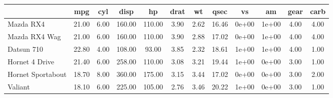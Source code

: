 \begin{tabular}{lccccccccccc}
\hline
\textbf{} & \textbf{mpg} & \textbf{cyl} & \textbf{disp} & \textbf{hp} & \textbf{drat} & \textbf{wt} & \textbf{qsec} & \textbf{vs} & \textbf{am} & \textbf{gear} & \textbf{carb} \\
\hline
Mazda RX4 & 21.00 & 6.00 & 160.00 & 110.00 & 3.90 & 2.62 & 16.46 & 0e+00 & 1e+00 & 4.00 & 4.00\\
Mazda RX4 Wag & 21.00 & 6.00 & 160.00 & 110.00 & 3.90 & 2.88 & 17.02 & 0e+00 & 1e+00 & 4.00 & 4.00\\
Datsun 710 & 22.80 & 4.00 & 108.00 &  93.00 & 3.85 & 2.32 & 18.61 & 1e+00 & 1e+00 & 4.00 & 1.00\\
Hornet 4 Drive & 21.40 & 6.00 & 258.00 & 110.00 & 3.08 & 3.21 & 19.44 & 1e+00 & 0e+00 & 3.00 & 1.00\\
Hornet Sportabout & 18.70 & 8.00 & 360.00 & 175.00 & 3.15 & 3.44 & 17.02 & 0e+00 & 0e+00 & 3.00 & 2.00\\
Valiant & 18.10 & 6.00 & 225.00 & 105.00 & 2.76 & 3.46 & 20.22 & 1e+00 & 0e+00 & 3.00 & 1.00\\
\hline
\end{tabular}
